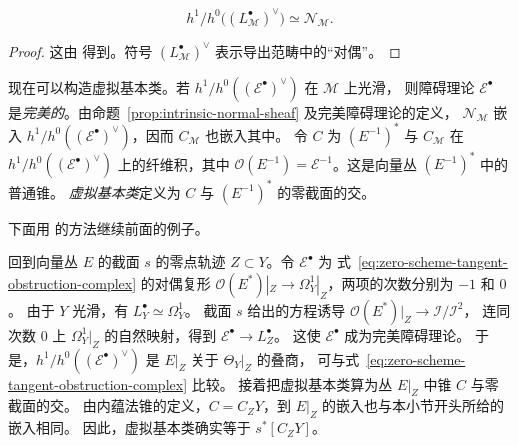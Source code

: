 \begin{proposition}\label{prop:intrinsic-normal-sheaf}
\[
h^1/h^0\bigl((L^\bullet_{\mathcal M})^\vee\bigr)
\simeq\mathcal N_{\mathcal M}.
\]
\end{proposition}
\begin{proof}
这由  得到。符号 $(L^\bullet_{\mathcal M})^\vee$ 表示导出范畴中的“对偶”。
\end{proof}

现在可以构造虚拟基本类。若 $h^1/h^0((\mathcal E^\bullet)^\vee)$ 在 $\mathcal M$ 上光滑，
则障碍理论 $\mathcal E^\bullet$ 是\emph{完美的}。由命题~\ref{prop:intrinsic-normal-sheaf} 及完美障碍理论的定义，
$\mathcal N_{\mathcal M}$ 嵌入 $h^1/h^0((\mathcal E^\bullet)^\vee)$，因而 $C_{\mathcal M}$ 也嵌入其中。
令 $C$ 为 $(E^{-1})^*$ 与 $C_{\mathcal M}$ 在 $h^1/h^0((\mathcal E^\bullet)^\vee)$ 上的纤维积，其中
$\mathcal O(E^{-1})=\mathcal E^{-1}$。这是向量丛 $(E^{-1})^*$ 中的普通锥。
\emph{虚拟基本类}定义为 $C$ 与 $(E^{-1})^*$ 的零截面的交。

下面用  的方法继续前面的例子。

\begingroup
{}
\renewcommand{\theHexam}{7.1.4.revisited.\arabic{exam}}
\begin{example}[再访]\label{ex:zero-scheme-bf-obstruction}
回到向量丛 $E$ 的截面 $s$ 的零点轨迹 $Z\subset Y$。令 $\mathcal E^\bullet$ 为
式~\eqref{eq:zero-scheme-tangent-obstruction-complex} 的对偶复形
$\mathcal O(E^*)|_Z\to\Omega_Y^1|_Z$，两项的次数分别为 $-1$ 和 $0$。
由于 $Y$ 光滑，有 $L_Y^\bullet\simeq\Omega_Y^1$。
截面 $s$ 给出的方程诱导 $\mathcal O(E^*)|_Z\to\mathcal I/\mathcal I^2$，
连同次数 $0$ 上 $\Omega_Y^1|_Z$ 的自然映射，得到 $\mathcal E^\bullet\to L_Z^\bullet$。
这使 $\mathcal E^\bullet$ 成为完美障碍理论。
于是，$h^1/h^0((\mathcal E^\bullet)^\vee)$ 是 $E|_Z$ 关于 $\Theta_Y|_Z$ 的叠商，
可与式~\eqref{eq:zero-scheme-tangent-obstruction-complex} 比较。
接着把虚拟基本类算为丛 $E|_Z$ 中锥 $C$ 与零截面的交。
由内蕴法锥的定义，$C=C_ZY$，到 $E|_Z$ 的嵌入也与本小节开头所给的嵌入相同。
因此，虚拟基本类确实等于 $s^*[C_ZY]$。
\end{example}
\endgroup

